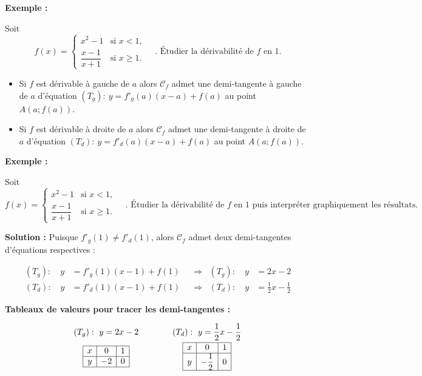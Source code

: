 \documentclass[12pt,a4paper]{article}
\begin{document}
\textbf{Exemple :}

Soit
\[
f(x)=
\begin{cases}
x^2-1 & \text{si } x<1,\\[1mm]
\dfrac{x-1}{x+1} & \text{si } x\geq 1.
\end{cases}
\quad
\text{. Étudier la dérivabilité de } f \text{ en } 1.
\]

\begin{tcolorbox}[
    colback=green!5,
    colframe=green!60!black,
    colbacktitle=green!60!black,
    title=\textbf{Interprétation graphique},
    fonttitle=\bfseries,
    boxrule=0.8pt
]

\begin{itemize}

    \item Si $f$ est dérivable à gauche de $a$ alors $\mathcal{C}_f$
    admet une demi-tangente à gauche de $a$ d'équation
    $(T_g):\ y=f'_g(a)(x-a)+f(a)$ au point $A(a;f(a))$.

    \item Si $f$ est dérivable à droite de $a$ alors $\mathcal{C}_f$
    admet une demi-tangente à droite de $a$ d'équation
    $(T_d):\ y=f'_d(a)(x-a)+f(a)$ au point $A(a;f(a))$.

\end{itemize}

\end{tcolorbox}

\textbf{Exemple :}

Soit
\[
f(x)=
\begin{cases}
x^2-1 & \text{si } x<1,\\[1mm]
\dfrac{x-1}{x+1} & \text{si } x\geq 1.
\end{cases}
\quad \text{. Étudier la dérivabilité de } f \text{ en } 1
\text{ puis interpréter graphiquement les résultats.}
\]

\textbf{Solution :} Puisque $f'_g(1)\neq f'_d(1)$, alors $\mathcal{C}_f$
admet deux demi-tangentes d'équations respectives :

\[
\begin{aligned}
(T_g):\quad y
&= f'_g(1)(x-1)+f(1)
&&\Longrightarrow&
(T_g):\quad y &= 2x-2
\\[2mm]
(T_d):\quad y
&= f'_d(1)(x-1)+f(1)
&&\Longrightarrow&
(T_d):\quad y &= \frac{1}{2}x-\frac{1}{2}
\end{aligned}
\]

\textbf{Tableaux de valeurs pour tracer les demi-tangentes :}

\[
\begin{array}{c@{\qquad\qquad}c}
(T_g):\ y=2x-2
&
(T_d):\ y=\dfrac{1}{2}x-\dfrac{1}{2}
\\[2mm]
\begin{array}{|c|c|c|}
\hline
x & 0 & 1\\
\hline
y & -2 & 0\\
\hline
\end{array}
&
\begin{array}{|c|c|c|}
\hline
x & 0 & 1\\
\hline
y & -\dfrac{1}{2} & 0\\
\hline
\end{array}
\end{array}
\]
\end{document}
